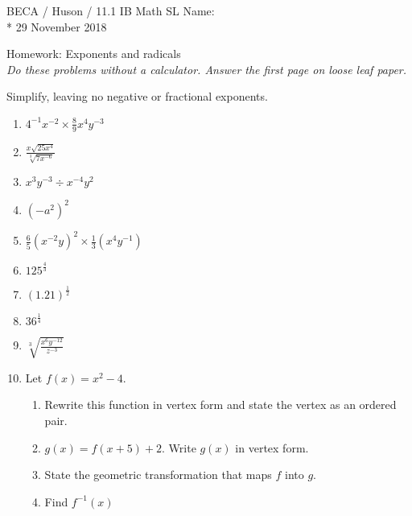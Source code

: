 \documentclass[]{book}
\begin{document}
\noindent BECA / Huson / 11.1 IB Math SL \hspace{2in} Name:\\*
29 November 2018
\begin{center}
{\Large Homework: Exponents and radicals}\\
\textit{Do these problems without a calculator. Answer the first page on loose leaf paper.}
\end{center}



Simplify, leaving no negative or fractional exponents.

\begin{enumerate}

\item $\displaystyle 4^{-1}x^{-2} \times \frac{8}{9}x^4 y^{-3}$\\[10pt]
\item $\displaystyle  \frac{x \sqrt{25x^4}}{\sqrt[3]{7x^{-6}}}$\\[10pt]
\item $x^3 y^{-3} \div x^{-4} y^2$\\[10pt]
\item $(-a^2)^2$\\[10pt]

\item $\displaystyle \frac{6}{5} (x^{-2} y)^2 \times \frac{1}{3}(x^4 y^{-1})$\\[10pt]

\item $\displaystyle  125^\frac{4}{3}$\\[10pt]
\item $\displaystyle  (1.21)^{\frac{1}{2}}$\\[10pt]

\item $\displaystyle  36^\frac{1}{4}$\\[10pt]
\item $\displaystyle  \sqrt[3]{\frac{x^6 y^{-12}}{z^{-3}}}$\\[10pt]

\item Let $f(x) = x^2 - 4$.
\begin{enumerate}
    \item Rewrite this function in vertex form and state the vertex as an ordered pair.
    \item $g(x)=f(x+5)+2$. Write $g(x)$ in vertex form.
    \item State the geometric transformation that maps $f$ into $g$.
    \item Find $f^{-1}(x)$
\end{enumerate}


\end{enumerate}
\end{document}
